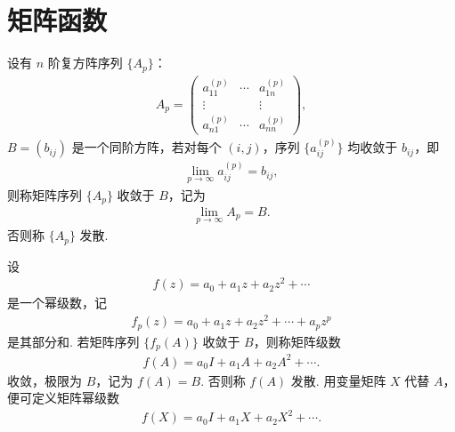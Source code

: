 \documentclass[../../main.tex]{subfiles}
\begin{document}
\section{矩阵函数}

\begin{definition}[复方阵幂级数]
设有 $n$ 阶复方阵序列 $\{A_p\}$：
\begin{align*}
A_p = \begin{pmatrix}
a_{11}^{(p)} & \cdots & a_{1n}^{(p)} \\
\vdots & & \vdots \\
a_{n1}^{(p)} & \cdots & a_{nn}^{(p)}
\end{pmatrix},
\end{align*}
$B = (b_{ij})$ 是一个同阶方阵，若对每个 $(i,j)$，序列 $\{a_{ij}^{(p)}\}$ 均收敛于 $b_{ij}$，即
\begin{align*}
\lim_{p \to \infty} a_{ij}^{(p)} = b_{ij},
\end{align*}
则称矩阵序列 $\{A_p\}$ 收敛于 $B$，记为
\begin{align*}
\lim_{p \to \infty} A_p = B.
\end{align*}
否则称 $\{A_p\}$ 发散.

设
\begin{align*}
f(z) = a_0 + a_1z + a_2z^2 + \cdots
\end{align*}
是一个幂级数，记
\begin{align*}
f_p(z) = a_0 + a_1z + a_2z^2 + \cdots + a_pz^p
\end{align*}
是其部分和. 若矩阵序列 $\{f_p(A)\}$ 收敛于 $B$，则称矩阵级数
\begin{align*}
f(A) = a_0I + a_1A + a_2A^2 + \cdots .
\end{align*}
收敛，极限为 $B$，记为 $f(A) = B$. 否则称 $f(A)$ 发散. 用变量矩阵 $X$ 代替 $A$，便可定义矩阵幂级数
\begin{align*}
f(X) = a_0I + a_1X + a_2X^2 + \cdots. 
\end{align*} 
\end{definition}
\end{document}
